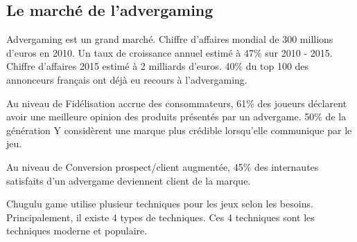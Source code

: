 \subsection{Le marché de l'advergaming} %

Advergaming est un grand marché. Chiffre d’affaires mondial de 300 millions d’euros en 2010. Un taux de croissance annuel estimé à 47\% sur 2010 - 2015. Chiffre d’affaires 2015 estimé à 2 milliards d’euros. 40\% du top 100 des annonceurs français ont déjà eu recours à l’advergaming.

Au niveau de Fidélisation accrue des consommateurs, 61\% des joueurs déclarent avoir une meilleure opinion des produits présentés par un advergame. 50\% de la génération Y considèrent une marque plus crédible lorsqu'elle communique par le jeu.

Au niveau de Conversion prospect/client augmentée, 45\% des internautes satisfaits d’un advergame deviennent client de la marque.




Chugulu game utilise plusieur techniques pour les jeux selon les besoins. Principalement, il existe 4 types de techniques. Ces 4 techniques sont les techniques moderne et populaire. 

